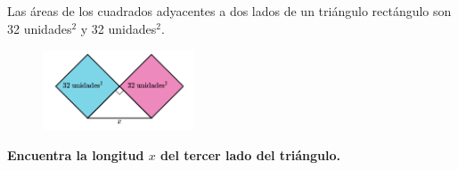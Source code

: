 \question[15]  Las áreas de los cuadrados adyacentes a dos lados de un triángulo rectángulo son 32 unidades$^2$ y 32 unidades$^2$.
\begin{figure}[H]
    \begin{center}
        \includegraphics[width=0.4\textwidth]{../images/area1.png}
    \end{center}
    \caption{}
    \label{fig:area1}
\end{figure}
\textbf{Encuentra la longitud $x$ del tercer lado del triángulo.}